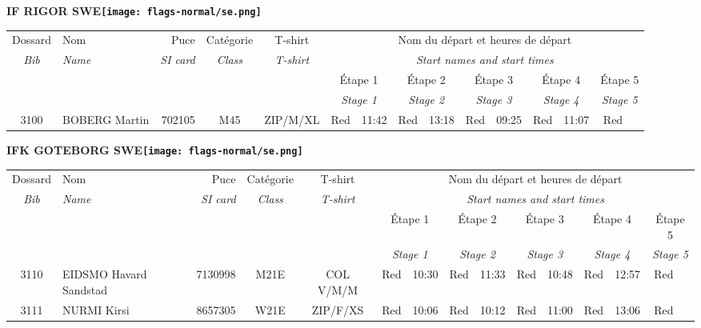 \documentclass{report}
\begin{document}
\newpage
  \Huge \centering \bfseries IF RIGOR  SWE\normalfont \footnotesize \sffamily \hfill \texttt{[image: flags-normal/se.png]} \newline 
  \begin{longtable}{|c|l|r|c|c|*{5}{cc|}}
    Dossard & Nom  & Puce    & Catégorie & T-shirt & \multicolumn{10}{c|}{Nom du départ et heures de départ} \\
    \itshape Bib     & \itshape Name & \itshape SI card & \itshape Class  & \itshape  T-shirt  & \multicolumn{10}{c|}{\itshape Start names and start times} \\
    \hline
    & & & & & \multicolumn{2}{c|}{Étape 1} & \multicolumn{2}{c|}{Étape 2} & \multicolumn{2}{c|}{Étape 3} & \multicolumn{2}{c|}{Étape 4} & \multicolumn{2}{c|}{Étape 5} \\
    & & & & & \multicolumn{2}{c|}{\itshape Stage 1} & \multicolumn{2}{c|}{\itshape Stage 2} & \multicolumn{2}{c|}{\itshape Stage 3} & \multicolumn{2}{c|}{\itshape Stage 4} & \multicolumn{2}{c|}{\itshape Stage 5} \\
    \hline
    3100 & BOBERG Martin & 702105 & M45 & ZIP/M/XL & Red & 11:42 & Red & 13:18 & Red & 09:25 & Red & 11:07 & Red &  \\
  \end{longtable}
\newpage
  \Huge \centering \bfseries IFK GOTEBORG  SWE\normalfont \footnotesize \sffamily \hfill \texttt{[image: flags-normal/se.png]} \newline 
  \begin{longtable}{|c|l|r|c|c|*{5}{cc|}}
    Dossard & Nom  & Puce    & Catégorie & T-shirt & \multicolumn{10}{c|}{Nom du départ et heures de départ} \\
    \itshape Bib     & \itshape Name & \itshape SI card & \itshape Class  & \itshape  T-shirt  & \multicolumn{10}{c|}{\itshape Start names and start times} \\
    \hline
    & & & & & \multicolumn{2}{c|}{Étape 1} & \multicolumn{2}{c|}{Étape 2} & \multicolumn{2}{c|}{Étape 3} & \multicolumn{2}{c|}{Étape 4} & \multicolumn{2}{c|}{Étape 5} \\
    & & & & & \multicolumn{2}{c|}{\itshape Stage 1} & \multicolumn{2}{c|}{\itshape Stage 2} & \multicolumn{2}{c|}{\itshape Stage 3} & \multicolumn{2}{c|}{\itshape Stage 4} & \multicolumn{2}{c|}{\itshape Stage 5} \\
    \hline
    3110 & EIDSMO Havard Sandstad & 7130998 & M21E & COL V/M/M & Red & 10:30 & Red & 11:33 & Red & 10:48 & Red & 12:57 & Red &  \\
    3111 & NURMI Kirsi & 8657305 & W21E & ZIP/F/XS & Red & 10:06 & Red & 10:12 & Red & 11:00 & Red & 13:06 & Red &  \\
  \end{longtable}
\end{document}
